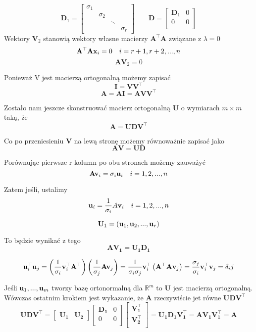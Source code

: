 \documentclass{article}
\begin{document}
\[
\mathbf{D}_1 = \begin{bmatrix}
\sigma_1 & & & \\
& \sigma_2 & & \\
& & \ddots & \\
& & & \sigma_r
\end{bmatrix}
\qquad
\mathbf{D} = \begin{bmatrix}
\mathbf{D}_1 & 0 \\
0 & 0 \\
\end{bmatrix}
\]
Wektory $\mathbf{V}_2$ stanowią wektory własne macierzy $\mathbf{A^\top A}$ związane z $\lambda = 0$
\[\mathbf{A}^\top \mathbf{A} \vb{x}_i = 0 \quad i = r+1, r+2,..., n \]
\[\mathbf{AV}_2 = 0 \]

Ponieważ V jest macierzą ortogonalną możemy zapisać
\[\mathbf{I = VV^\top} \]
\[\mathbf{A = AI = AVV^\top} \]

Zostało nam jeszcze skonstruować macierz ortogonalną $\mathbf{U}$ o wymiarach $m\times m$ taką, że
\[\mathbf{A = UDV^\top} \]

Co po przeniesieniu $\mathbf{V}$ na lewą stronę możemy równoważnie zapisać jako
\[\mathbf{AV = UD} \]

Porównując pierwsze r kolumn po obu stronach możemy zauważyć
\[\mathbf{A} \vb{v}_i = \sigma_i \vb{u}_i \quad i = 1, 2,..., n \]

Zatem jeśli, ustalimy 
\[\vb{u}_i = \frac{1}{\sigma_i}A \vb{v}_i \quad i = 1, 2,..., n \]

\[\mathbf{U}_1 = (\vb{u}_1, \vb{u}_2,..., \vb{u}_r) \]

To będzie wynikać z tego
\[\mathbf{AV_1 = U_1 D_1} \]

\[\vb{u}_i^\top \vb{u}_j = \left(\frac{1}{\sigma_i}\vb{v}_i^\top \mathbf{A}^\top \right) \left(\frac{1}{\sigma_j}\mathbf{A} \vb{v}_j \right)
= \frac{1}{\sigma_i \sigma_j}\vb{v}_i^\top \left( \mathbf{A^\top A} \vb{v}_j \right)
= \frac{\sigma_j}{\sigma_i} \vb{v}_i^\top \vb{v}_j 
= \delta_ij \]

Jeśli $\vb{u}_1,..., \vb{u}_m$ tworzy bazę ortonormalną dla $\mathbb{R}^m$ to $\mathbf{U}$ jest macierzą ortogonalną. Wówczas ostatnim krokiem jest wykazanie, że $\mathbf{A}$ rzeczywiście jet równe $\mathbf{UDV^\top}$
\[\mathbf{UDV^\top} = \begin{bmatrix}
\mathbf{U_1} & \mathbf{U_2}
\end{bmatrix}
\begin{bmatrix}
\mathbf{D_1} & 0 \\
0 & 0 \\
\end{bmatrix}
\begin{bmatrix}
\mathbf{V_1^\top} \\
\mathbf{V_2^\top} \\
\end{bmatrix}
= \mathbf{U_1 D_1 V_1^\top = AV_1 V_1^\top = A} \]
\end{document}
